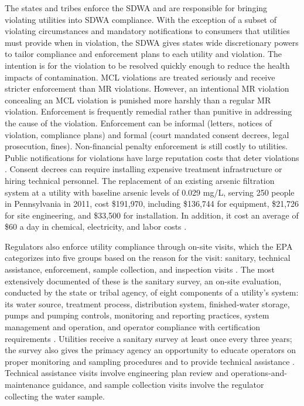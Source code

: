 \documentclass[12pt]{article}
\begin{document}
The states and tribes enforce the SDWA and are responsible for bringing violating utilities into SDWA compliance. With the exception of a subset of violating circumstances and mandatory notifications to consumers that utilities must provide when in violation, the SDWA gives states wide discretionary powers to tailor compliance and enforcement plans to each utility and violation. The intention is for the violation to be resolved quickly enough to reduce the health impacts of contamination. MCL violations are treated seriously and receive stricter enforcement than MR violations. However, an intentional MR violation concealing an MCL violation is punished more harshly than a regular MR violation. Enforcement is frequently remedial rather than punitive in addressing the cause of the violation. Enforcement can be informal (letters, notices of violation, compliance plans) and formal (court mandated consent decrees, legal prosecution, fines). Non-financial penalty enforcement is still costly to utilities. Public notifications for violations have large reputation costs that deter violations \parencite{bennear2008impacts}. Consent decrees can require installing expensive treatment infrastructure or hiring technical personnel. The replacement of an existing arsenic filtration system at a utility with baseline arsenic levels of 0.029 mg/L, serving 250 people in Pennsylvania in 2011, cost \$191,970, including \$136,744 for equipment, \$21,726 for site engineering, and \$33,500 for installation. In addition, it cost an average of \$60 a day in chemical, electricity, and labor costs \parencite{epaarsenicbat}.

Regulators also enforce utility compliance through on-site visits, which the EPA categorizes into five groups based on the reason for the visit: sanitary, technical assistance, enforcement, sample collection, and inspection visits \parencite{epaSDWAEchoDownload}. The most extensively documented of these is the sanitary survey, an on-site evaluation, conducted by the state or tribal agency, of eight components of a utility's system: its water source, treatment process, distribution system, finished-water storage, pumps and pumping controls, monitoring and reporting practices, system management and operation, and operator compliance with certification requirements \parencite{epaSanitarySurveys}. Utilities receive a sanitary survey at least once every three years; the survey also gives the primacy agency an opportunity to educate operators on proper monitoring and sampling procedures and to provide technical assistance \parencite{epaSanitarySurveys}. Technical assistance visits involve engineering plan review and operations-and-maintenance guidance, and sample collection visits involve the regulator collecting the water sample.
\end{document}
